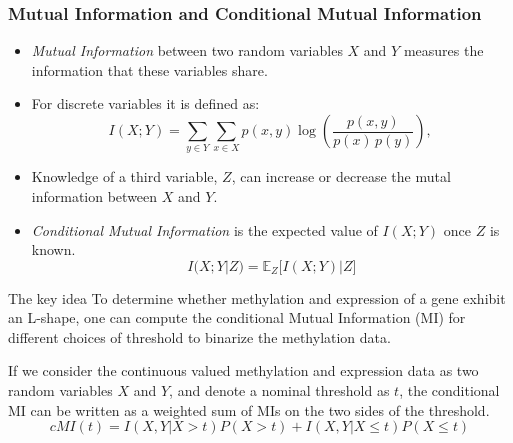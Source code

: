 \documentclass[handout]{beamer}
\begin{document}
\begin{frame}[allowframebreaks]
\frametitle{Mutual Information and Conditional Mutual Information}
\begin{itemize}
\item   \emph{Mutual Information} between two random variables $X$
and $Y$ measures the information that these variables share.
\item For discrete variables it is defined as:
\[
 I(X;Y)= \sum_{y \in Y} \sum_{x \in X} 
                 p(x,y) \log{ \left(\frac{p(x,y)}{p(x)\,p(y)}
                              \right) }, \,\!
\]
\item Knowledge of a third variable, $Z$, can increase or decrease the mutal
information between $X$ and $Y$.
\item \emph{Conditional Mutual Information} is the expected value of $I(X;Y)$ once $Z$ is
known.
\[
I(X;Y|Z) = \mathbb E_Z \big[ I(X;Y)|Z\big ]
\]
\end{itemize}

\framebreak

\begin{block}{The key idea}
To determine whether methylation and expression of a gene exhibit an L-shape,
one can compute the conditional Mutual Information (MI) for different choices of threshold
to binarize the methylation data.
\end{block}
If we consider the continuous valued methylation and expression data as two random variables
$X$ and $Y$, and denote a nominal threshold as $t$, the conditional MI can be written as a
weighted sum of MIs on the two sides of the threshold.
\[
\mathit{cMI}(t)=I(X,Y|X>t) P(X>t) + I(X,Y|X\le t)P(X\le t)
\]
\end{frame}
\end{document}
